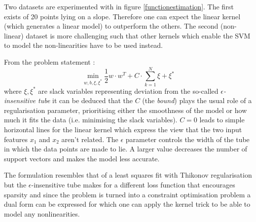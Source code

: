 

Two datasets are experimented with in figure \ref{functionestimation}. The first exists of 20 points lying on a slope. Therefore one can expect the linear kernel (which generates a linear model) to outperform the others. The second (non-linear) dataset is more challenging such that other kernels which enable the SVM to model the non-linearities have to be used instead. 

\par From the problem statement :
$$\min_{w,b,\xi,\xi^*}\frac{1}{2}w\cdot w^T+C\cdot\sum_{k=1}^N\xi+\xi^*$$
where $\xi,\xi^*$ are slack variables representing deviation from the so-called \textit{$\epsilon$-insensitive tube} it can be deduced that the $C$ (the \textit{bound}) plays the usual role of a regularisation parameter, prioritising either the smoothness of the model or how much it fits the data (i.e. minimising the slack variables). $C=0$ leads to simple horizontal lines for the linear kernel which express the view that the two input features $x_1$ and $x_2$ aren't related. The $\epsilon$ parameter controls the width of the tube in which the data points are made to lie. A larger value decreases the number of support vectors and makes the model less accurate.

\par The formulation resembles that of a least squares fit with Thikonov regularisation but the $\epsilon$-insensitive tube makes for a different loss function that encourages sparsity and since the problem is turned into a constraint optimisation problem a dual form can be expressed for which one can apply the kernel trick to be able to model any nonlinearities.

